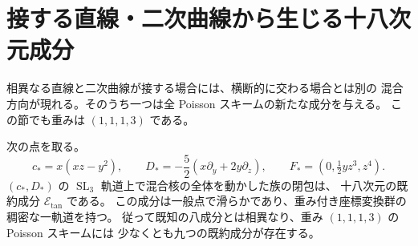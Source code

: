 \section{接する直線・二次曲線から生じる十八次元成分}
\label{sec:tangent-component-v33}

相異なる直線と二次曲線が接する場合には、横断的に交わる場合とは別の
混合方向が現れる。そのうち一つは全 Poisson スキームの新たな成分を与える。
この節でも重みは $(1,1,1,3)$ である。

\begin{theorem}[接線型の成分]
\label{thm:tangent-component-v33}
次の点を取る。
\begin{equation}
 c_*=x(xz-y^2),\qquad
 D_*=-\frac52(x\partial_y+2y\partial_z),\qquad
 F_*=(0,\tfrac12yz^3,z^4).
 \label{eq:tangent-point-v33}
\end{equation}
$(c_*,D_*)$ の $\operatorname{SL}_3$ 軌道上で混合核の全体を動かした族の閉包は、
十八次元の既約成分 $\mathcal E_{\mathrm{tan}}$ である。
この成分は一般点で滑らかであり、重み付き座標変換群の稠密な一軌道を持つ。
従って既知の八成分とは相異なり、重み $(1,1,1,3)$ の Poisson スキームには
少なくとも九つの既約成分が存在する。
\end{theorem}

